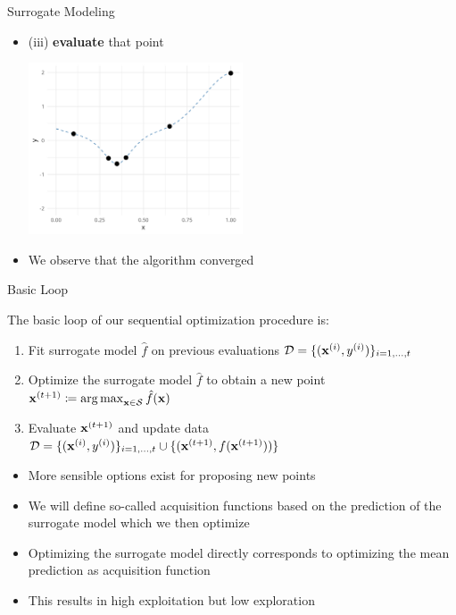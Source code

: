 \documentclass[11pt,compress,t,notes=noshow, xcolor=table]{beamer}
\begin{document}
\begin{vbframe}{Surrogate Modeling}
\begin{itemize}
\framebreak

\item (iii) \textbf{evaluate} that point
\vspace{+.45cm}

\begin{center}
  \includegraphics[width = 0.5\textwidth]{figure_man/loop_9.png}
\end{center}

\item We observe that the algorithm converged

\end{itemize}

\end{vbframe}

\begin{vbframe}{Basic Loop}

The basic loop of our sequential optimization procedure is:
  \begin{enumerate}
    \item Fit surrogate model $\hat{f}$ on previous evaluations $\mathcal{D} = \{(\mathbf{x}^{(i)}, y^{(i)})\}_{i = 1, \ldots, t}$
    \item Optimize the surrogate model $\hat{f}$ to obtain a new point $\mathbf{x}^{(t + 1)} \coloneqq \operatorname{arg\,max}_{\mathbf{x} \in \mathcal{S}} \hat{f}(\mathbf{x})$
    \item Evaluate $\mathbf{x}^{(t + 1)}$ and update data $\mathcal{D} = \{(\mathbf{x}^{(i)}, y^{(i)})\}_{i = 1, \ldots, t} \cup \{(\mathbf{x}^{(t + 1)}, f(\mathbf{x}^{(t + 1)}))\}$
  \end{enumerate}

\framebreak

\begin{itemize}
  \item More sensible options exist for proposing new points
  \item We will define so-called acquisition functions based on the prediction of the surrogate model which we then optimize
  \item Optimizing the surrogate model directly corresponds to optimizing the mean prediction as acquisition function
  \item This results in high exploitation but low exploration
\end{itemize}

\end{vbframe}
\end{document}

